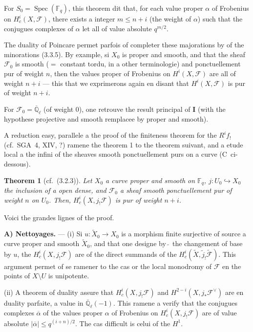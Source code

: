 \documentclass[12pt,a4paper]{article}
\theoremstyle{plain}
\newtheorem{theorem}{Theorem}[section]
\theoremstyle{definition}
\theoremstyle{definition}
\theoremstyle{remark}
\DeclareMathOperator{\Spec}{Spec}
\begin{document}
For $S_0 = \Spec(\mathbb{F}_q)$, this theorem dit that, for each value proper $\alpha$ of Frobenius on $H_c^i(X, \mathscr{F})$, there exists a integer $m \leq n+i$ (the weight of $\alpha$) such that the conjugues complexes of $\alpha$ let all of value absolute $q^{m/2}$.

The duality of Poincare permet parfois of completer these majorations by of the minorations (3.3.5). By example, si $X_0$ is proper and smooth, and that the sheaf $\mathscr{F}_0$ is smooth ($=$ constant tordu, in a other terminologie) and ponctuellement pur of weight $n$, then the values proper of Frobenius on $H^i(X, \mathscr{F})$ are all of weight $n+i$ --- this that we exprimerons again en disant that $H^i(X, \mathscr{F})$ is pur of weight $n+i$.

For $\mathscr{F}_0 = \overline{\mathbb{Q}}_\ell$ (of weight $0$), one retrouve the result principal of \textbf{I} (with the hypothese projective and smooth remplacee by proper and smooth).

A reduction easy, parallele a the proof of the finiteness theorem for the $R^i f_!$ (cf.~SGA~4, XIV, ?) ramene the theorem 1 to the theorem suivant, and a etude local a the infini of the sheaves smooth ponctuellement purs on a curve (C~ci-dessous).

\begin{theorem}[cf.~(3.2.3)]
Let $X_0$ a curve proper and smooth on $\mathbb{F}_q$, $j: U_0 \hookrightarrow X_0$ the inclusion of a open dense, and $\mathscr{F}_0$ a sheaf smooth ponctuellement pur of weight $n$ on $U_0$. Then, $H_c^i(X, j_! \mathscr{F})$ is pur of weight $n+i$.
\end{theorem}

Voici the grandes lignes of the proof.

\medskip
\textbf{A) Nettoyages.} --- (i) Si $u: \widetilde{X}_0 \to X_0$ is a morphism finite surjective of source a curve proper and smooth $\widetilde{X}_0$, and that one designe by $\widetilde{\;}$ the changement of base by $u$, the $H_c^i(X, j_! \mathscr{F})$ are of the direct summands of the $H_c^i(\widetilde{X}, \tilde{j}_! \widetilde{\mathscr{F}})$. This argument permet of se ramener to the cas or the local monodromy of $\mathscr{F}$ en the points of $X \setminus U$ is unipotente.

(ii) A theorem of duality assure that $H_c^i(X, j_! \mathscr{F})$ and $H^{2-i}(X, j_* \mathscr{F}^\vee)$ are en duality parfaite, a value in $\overline{\mathbb{Q}}_\ell(-1)$. This ramene a verify that the conjugues complexes $\overline{\alpha}$ of the values proper $\alpha$ of Frobenius on $H_c^i(X, j_! \mathscr{F})$ are of value absolute $|\overline{\alpha}| \leq q^{(i+n)/2}$. The cas difficult is celui of the $H^1$.
\end{document}
